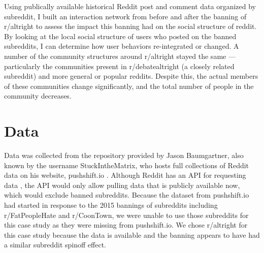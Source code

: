 \documentclass[twoside,twocolumn]{article}
\begin{document}
Using publically available historical Reddit post and comment data organized by subreddit, I built an interaction network from before and after the banning of r/altright to assess the impact this banning had on the social structure of reddit. By looking at the local social structure of users who posted on the banned subreddits, I can determine how user behaviors re-integrated or changed. A number of the community structures around r/altright stayed the same --- particularly the communities present in r/debatealtright (a closely related subreddit) and more general or popular reddits. Despite this, the actual members of these communities change significantly, and the total number of people in the community decreases. 



\section{Data}

Data was collected from the repository provided by Jason Baumgartner, also known by the username Stuck\textunderscore In\textunderscore the\textunderscore Matrix, who hosts full collections of Reddit data on his website, pushshift.io \cite{pushshift}. Although Reddit has an API for requesting data \cite{redditAPI}, the API would only allow pulling data that is publicly available now, which would exclude banned subreddits. Because the dataset from pushshift.io had started in response to the 2015 bannings of subreddits including r/FatPeopleHate and r/CoonTown, we were unable to use those subreddits for this case study as they were missing from pushshift.io. We chose r/altright for this case study because the data is available and the banning appears to have had a similar subreddit spinoff effect. 
\end{document}

